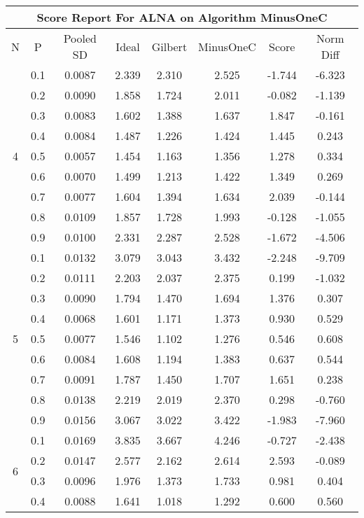 \documentclass[11pt,a4paper]{report}
\begin{document}
\begin{longtable}{ | c | c || c | c | c | c | c | c | }
\hline
\multicolumn{8}{|c|}{ Score Report For ALNA on Algorithm MinusOneC} \\
\hline
N & P & Pooled SD &  Ideal &  Gilbert & MinusOneC  & Score & Norm Diff \\
 \hline
 \hline
 \endhead
\multirow{9}{*}{4} & 0.1 & 0.0087 & 2.339 & 2.310 & 2.525 & -1.744 & -6.323 \\
 & 0.2 & 0.0090 & 1.858 & 1.724 & 2.011 & -0.082 & -1.139 \\
 & 0.3 & 0.0083 & 1.602 & 1.388 & 1.637 & 1.847 & -0.161 \\
 & 0.4 & 0.0084 & 1.487 & 1.226 & 1.424 & 1.445 & 0.243 \\
 & 0.5 & 0.0057 & 1.454 & 1.163 & 1.356 & 1.278 & 0.334 \\
 & 0.6 & 0.0070 & 1.499 & 1.213 & 1.422 & 1.349 & 0.269 \\
 & 0.7 & 0.0077 & 1.604 & 1.394 & 1.634 & 2.039 & -0.144 \\
 & 0.8 & 0.0109 & 1.857 & 1.728 & 1.993 & -0.128 & -1.055 \\
 & 0.9 & 0.0100 & 2.331 & 2.287 & 2.528 & -1.672 & -4.506 \\
 \hline
\multirow{9}{*}{5} & 0.1 & 0.0132 & 3.079 & 3.043 & 3.432 & -2.248 & -9.709 \\
 & 0.2 & 0.0111 & 2.203 & 2.037 & 2.375 & 0.199 & -1.032 \\
 & 0.3 & 0.0090 & 1.794 & 1.470 & 1.694 & 1.376 & 0.307 \\
 & 0.4 & 0.0068 & 1.601 & 1.171 & 1.373 & 0.930 & 0.529 \\
 & 0.5 & 0.0077 & 1.546 & 1.102 & 1.276 & 0.546 & 0.608 \\
 & 0.6 & 0.0084 & 1.608 & 1.194 & 1.383 & 0.637 & 0.544 \\
 & 0.7 & 0.0091 & 1.787 & 1.450 & 1.707 & 1.651 & 0.238 \\
 & 0.8 & 0.0138 & 2.219 & 2.019 & 2.370 & 0.298 & -0.760 \\
 & 0.9 & 0.0156 & 3.067 & 3.022 & 3.422 & -1.983 & -7.960 \\
 \hline
\multirow{9}{*}{6} & 0.1 & 0.0169 & 3.835 & 3.667 & 4.246 & -0.727 & -2.438 \\
 & 0.2 & 0.0147 & 2.577 & 2.162 & 2.614 & 2.593 & -0.089 \\
 & 0.3 & 0.0096 & 1.976 & 1.373 & 1.733 & 0.981 & 0.404 \\
 & 0.4 & 0.0088 & 1.641 & 1.018 & 1.292 & 0.600 & 0.560 \\

\end{longtable}
\end{document}
